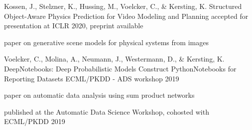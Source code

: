 

\begin{cventries}

  \cventry
    {Kossen, J., Stelzner, K., Hussing, M., Voelcker, C., \& Kersting, K.} %
    {Structured Object-Aware Physics Prediction for Video Modeling and Planning} %
    {accepted for presentation at ICLR 2020, preprint available} %
    {} %
    {
      \begin{cvitems} %
        \item {paper on generative scene models for physical systems from images}
      \end{cvitems}
    }

  \cventry
    {Voelcker, C., Molina, A., Neumann, J., Westermann, D., \& Kersting, K.} %
    {DeepNotebooks: Deep Probabilistic Models Construct PythonNotebooks for Reporting Datasets} %
    {ECML/PKDD - ADS workshop 2019} %
    {} %
    {
      \begin{cvitems} %
        \item {paper on automatic data analysis using sum product networks}
        \item {published at the Automatic Data Science Workshop, cohosted with ECML/PKDD 2019}
      \end{cvitems}
    }


\end{cventries}



